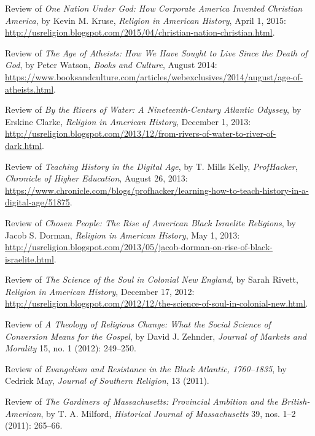 \documentclass[11pt]{article}
\begin{document}
Review of \emph{One Nation Under God: How Corporate America Invented Christian 
  America}, by Kevin M. Kruse, \emph{Religion in American History}, April 1, 
2015: 
\url{http://usreligion.blogspot.com/2015/04/christian-nation-christian.html}.


Review of \emph{The Age of Atheists: How We Have Sought to Live Since
  the Death of God}, by Peter Watson, \emph{Books and Culture}, August
2014: 
\url{https://www.booksandculture.com/articles/webexclusives/2014/august/age-of-atheists.html}.

Review of \emph{By the Rivers of Water: A Nineteenth-Century Atlantic
  Odyssey}, by Erskine Clarke, \emph{Religion in American History},
December 1, 2013: 
\url{http://usreligion.blogspot.com/2013/12/from-rivers-of-water-to-river-of-dark.html}.

Review of \emph{Teaching History in the Digital Age}, by T. Mills Kelly,
\emph{ProfHacker}, \emph{Chronicle of Higher Education}, August 26,
2013: 
\url{https://www.chronicle.com/blogs/profhacker/learning-how-to-teach-history-in-a-digital-age/51875}.

Review of \emph{Chosen People: The Rise of American Black Israelite
  Religions}, by Jacob S. Dorman, \emph{Religion in American History}, May
1, 2013: 
\url{http://usreligion.blogspot.com/2013/05/jacob-dorman-on-rise-of-black-israelite.html}.

Review of \emph{The Science of the Soul in Colonial New England}, by
Sarah Rivett, \emph{Religion in American History}, December 17, 2012: 
\url{http://usreligion.blogspot.com/2012/12/the-science-of-soul-in-colonial-new.html}.

Review of \emph{A Theology of Religious Change: What the Social Science
  of Conversion Means for the Gospel}, by David J. Zehnder, \emph{Journal
  of Markets and Morality} 15, no. 1 (2012): 249--250.

Review of \emph{Evangelism and Resistance in the Black Atlantic,
  1760--1835}, by Cedrick May, \emph{Journal of Southern Religion}, 13
(2011).

Review of \emph{The Gardiners of Massachusetts: Provincial Ambition and
  the British-American}, by T. A. Milford, \emph{Historical Journal of
  Massachusetts} 39, nos. 1--2 (2011): 265--66.
\end{document}
